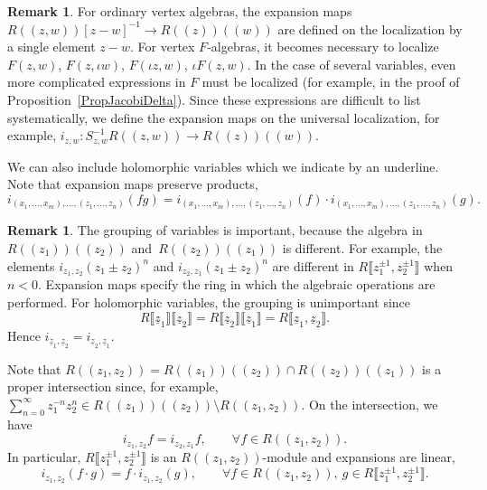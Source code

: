 \documentclass[10pt,a4paper]{amsart}
\numberwithin{equation}{section}
\theoremstyle{definition}
\newtheorem{Remark}[Theorem]{Remark}
\def\lb{\llbracket}
\def\rb{\rrbracket}
\begin{document}
\begin{Remark}
For ordinary vertex algebras, the expansion maps $R(\!( z,w)\!)[z-w]^{-1}\to R(\!( z)\!)(\!( w)\!)$ are defined on the localization by a single element $z-w$. For vertex $F$-algebras, it becomes necessary to localize $F(z,w)$, $F(z,\iota w)$, $F(\iota z,w)$, $\iota F(z,w)$. In the case of several variables, even more complicated expressions in $F$ must be localized (for example, in the proof of Proposition~\ref{PropJacobiDelta}). Since these expressions are difficult to list systematically, we define the expansion maps on the universal localization, for example, $i_{z,w}\colon S_{z,w}^{-1}R(\!( z,w)\!)\to R(\!( z)\!)(\!( w)\!)$.
\end{Remark}

We can also include holomorphic variables which we indicate by an underline. Note that expansion maps preserve products,
 \[
 i_{(x_1,\dots, x_m),\dots, (z_1,\dots, z_n)}(fg)
=i_{(x_1,\dots, x_m),\dots, (z_1,\dots, z_n)}(f)
\cdot i_{(x_1,\dots, x_m),\dots, (z_1,\dots, z_n)}(g).
 \]

\begin{Remark}
The grouping of variables is important, because the algebra in $R(\!( z_1)\!)(\!( z_2)\!)$ and~${R(\!( z_2)\!)(\!( z_1)\!)}$ is different. For example, the elements $i_{z_1,z_2}(z_1\pm z_2)^n$ and $i_{z_2,z_1}(z_1\pm z_2)^n$ are different in $R\big\lb z_1^{\pm1},z_2^{\pm1}\big\rb$ when $n<0$. Expansion maps specify the ring in which the algebraic operations are performed. For holomorphic variables, the grouping is unimportant since
\[
 R\lb\underline z_1\rb \lb\underline z_2\rb = R\lb\underline z_2\rb \lb\underline z_1\rb = R\lb\underline z_1,\underline z_2\rb.
\]
Hence $i_{\underline z_1,\underline z_2}=i_{\underline z_2,\underline z_1}$.
\end{Remark}

Note that $R(\!( z_1,z_2)\!)=R(\!( z_1)\!)(\!( z_2)\!)\cap R(\!( z_2)\!)(\!( z_1)\!)$ is a proper intersection since, for example, $\sum_{n=0}^\infty z_1^{-n}z_2^n\in R(\!( z_1)\!)(\!( z_2)\!)\setminus R(\!( z_1,z_2)\!)$. On the intersection, we have
\begin{equation}\label{swap-expansion}
 i_{z_1,z_2}f=i_{z_2,z_1}f,\qquad\forall f\in R(\!( z_1,z_2)\!).
\end{equation}
In particular, $R\big\lb z_1^{\pm1},z_2^{\pm1}\big\rb$ is an $R(\!( z_1,z_2)\!)$-module and expansions are linear,
\begin{equation}
\label{PowerSeriesLinearity}
 i_{z_1,z_2}(f\cdot g)=f\cdot i_{z_1,z_2}(g),\qquad \forall f\in R(\!( z_1,z_2)\!), \ g\in R\big\lb z_1^{\pm1},z_2^{\pm1}\big\rb.
\end{equation}
\end{document}
